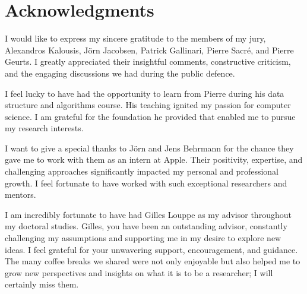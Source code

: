 
\chapter*{Acknowledgments}
I would like to express my sincere gratitude to the members of my jury, Alexandros Kalousis, J{\"o}rn Jacobsen, Patrick Gallinari, Pierre Sacr{\'e}, and Pierre Geurts. I greatly appreciated their insightful comments, constructive criticism, and the engaging discussions we had during the public defence.

I feel lucky to have had the opportunity to learn from Pierre during his data structure and algorithms course. His teaching ignited my passion for computer science. I am grateful for the foundation he provided that enabled me to pursue my research interests.

I want to give a special thanks to J{\"o}rn and Jens Behrmann for the chance they gave me to work with them as an intern at Apple. Their positivity, expertise, and challenging approaches significantly impacted my personal and professional growth. I feel fortunate to have worked with such exceptional researchers and mentors.

I am incredibly fortunate to have had Gilles Louppe as my advisor throughout my doctoral studies. Gilles, you have been an outstanding advisor, constantly challenging my assumptions and supporting me in my desire to explore new ideas. I feel grateful for your unwavering support, encouragement, and guidance. The many coffee breaks we shared were not only enjoyable but also helped me to grow new perspectives and insights on what it is to be a researcher; I will certainly miss them.

